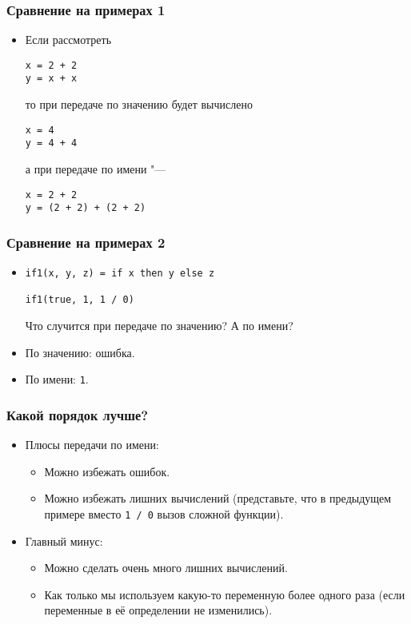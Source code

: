 \documentclass[11pt]{beamer}
\begin{document}
\begin{frame}[fragile]
  \frametitle{Сравнение на примерах 1}
  \begin{itemize}
    \item Если рассмотреть
          \begin{lstlisting}
x = 2 + 2
y = x + x
\end{lstlisting}
          то при передаче по значению будет вычислено \pause
          \begin{lstlisting}
x = 4
y = 4 + 4
\end{lstlisting}
          а при передаче по имени "--- \pause
          \begin{lstlisting}
x = 2 + 2
y = (2 + 2) + (2 + 2)
\end{lstlisting}
  \end{itemize}
\end{frame}

\begin{frame}[fragile]
  \frametitle{Сравнение на примерах 2}
  \begin{itemize}
    \item
          \begin{lstlisting}
if1(x, y, z) = if x then y else z

if1(true, 1, 1 / 0)
\end{lstlisting}
          Что случится при передаче по значению? А по имени?
          \pause
    \item По значению: ошибка.
          \pause
    \item По имени: \lstinline|1|.
  \end{itemize}
\end{frame}

\begin{frame}[fragile]
  \frametitle{Какой порядок лучше?}
  \begin{itemize}
    \item Плюсы передачи по имени:
          \pause
          \begin{itemize}
            \item Можно избежать ошибок.
            \item Можно избежать лишних вычислений
                  \pause (представьте, что в предыдущем примере вместо \lstinline|1 / 0| вызов сложной функции).
          \end{itemize}
          \pause
    \item Главный минус:
          \pause
          \begin{itemize}
            \item Можно сделать очень много лишних вычислений.
                  \pause
            \item Как только мы используем какую-то переменную более одного раза
                  \pause (если переменные в её определении не изменились).
          \end{itemize}
  \end{itemize}
\end{frame}
\end{document}
